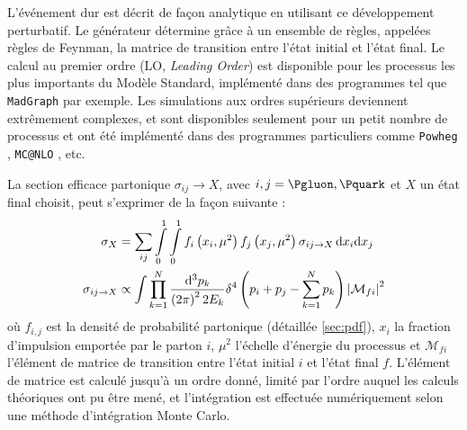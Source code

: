 L'événement dur est décrit de façon analytique en utilisant ce développement perturbatif. Le générateur détermine grâce à un ensemble de règles, appelées règles de Feynman, la matrice de transition entre l'état initial et l'état final. Le calcul au premier ordre (LO, \emph{Leading Order}) est disponible pour les processus les plus importants du Modèle Standard, implémenté dans des programmes tel que \texttt{MadGraph} \citep{madgraph} par exemple. Les simulations aux ordres supérieurs deviennent extrêmement complexes, et sont disponibles seulement pour un petit nombre de processus et ont été implémenté dans des programmes particuliers comme \texttt{Powheg} \citep{Alioli:2010xd}, \texttt{MC@NLO} \citep{1126-6708-2002-06-029}, etc.

La section efficace partonique $\sigma_{ij} \rightarrow X$, avec $i, j = \Pgluon, \Pquark$ et $X$ un état final choisit, peut s'exprimer de la façon suivante :
\begin{align}
  \sigma_{X} &= \sum_{ij} \int \displaylimits_0^1 \int \displaylimits_0^1 f_i\left( x_i, \mu^2 \right) f_j\left(x_j, \mu^2\right) \sigma_{ij \rightarrow X}\, \mathrm{d}x_i \mathrm{d}x_j \notag \\
  \sigma_{ij \rightarrow X} &\propto \int \prod \displaylimits_{k = 1}^{N} \frac{\mathrm{d}^3p_k}{\left( 2 \pi \right)^2 2 E_k} \delta^4\left( p_i + p_j - \sum_{k = 1}^{N} p_k \right) \left| \mathcal{M}_{fi} \right|^2 \label{eq:section_efficace}
\end{align}
où $f_{i, j}$ est la densité de probabilité partonique (détaillée \cref{sec:pdf}), $x_i$ la fraction d'impulsion emportée par le parton $i$, $\mu^2$ l'échelle d'énergie du processus et $\mathcal{M}_{fi}$ l'élément de matrice de transition entre l'état initial $i$ et l'état final $f$. L'élément de matrice est calculé jusqu'à un ordre donné, limité par l'ordre auquel les calculs théoriques ont pu être mené, et l'intégration est effectuée numériquement selon une méthode d'intégration Monte Carlo.

